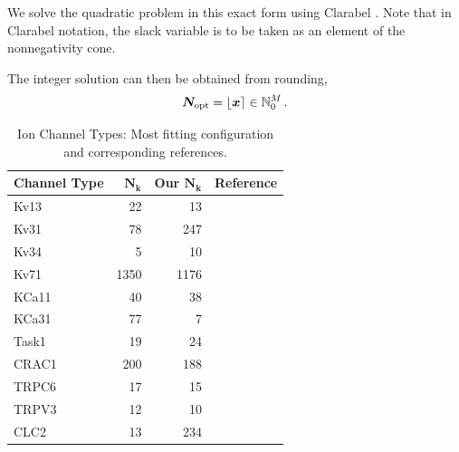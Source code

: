 We solve the quadratic problem in this exact form using Clarabel \cite{2024-clarabel}.
Note that in Clarabel notation, the slack variable is to be taken as an element of the nonnegativity cone.

The integer solution can then be obtained from rounding,
$${\bm{N}}_{\rm opt} = \lfloor {\bm{x}} \rceil \in \mathbb{N}_0^M\,.$$

\begin{table}
  \caption{Ion Channel Types: Most fitting configuration and corresponding references.}
  \begin{tabular}{lrrl}
    \textbf{Channel Type} & \textbf{$\bm{N_k}$ \cite{2021-A549-model}} & \textbf{Our $\bm{N_k}$} & \textbf{Reference} \\
    \midrule
    Kv13                  & 22                                         & 13                      & \cite{kv13-1}      \\
    Kv31                  & 78                                         & 247                     & \cite{kv31}        \\
    Kv34                  & 5                                          & 10                      & \cite{kv34}        \\
    Kv71                  & 1350                                       & 1176                    & \cite{kv71}        \\
    KCa11                 & 40                                         & 38                      & \cite{kca11}       \\
    KCa31                 & 77                                         & 7                       & \cite{kca31-2}     \\
    Task1                 & 19                                         & 24                      & \cite{task1}       \\
    CRAC1                 & 200                                        & 188                     & \cite{cracm1}      \\
    TRPC6                 & 17                                         & 15                      & \cite{trpc6}       \\
    TRPV3                 & 12                                         & 10                      & \cite{trpv3}       \\
    CLC2                  & 13                                         & 234                     & \cite{clc2}        \\
  \end{tabular}
  \label{table:channel-types}
\end{table}

